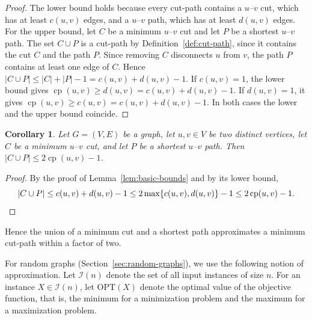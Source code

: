 \documentclass[a4paper,fleqn]{cas-sc}
\numberwithin{equation}{section}
\theoremstyle{definition}
\theoremstyle{plain}
\newtheorem{corollary}[definition]{Corollary}
\theoremstyle{remark}
\newcommand{\cp}{\operatorname{cp}}                  %
\newcommand{\OPT}{\mathrm{OPT}}
\begin{document}
\begin{proof}
The lower bound holds because every cut-path contains a $u$--$v$ cut, which has at least $c(u, v)$ edges, and a $u$--$v$ path, which has at least $d(u, v)$ edges.
For the upper bound, let $C$ be a minimum $u$--$v$ cut and let $P$ be a shortest $u$--$v$ path.
The set $C \cup P$ is a cut-path by Definition~\ref{def:cut-path}, since it contains the cut $C$ and the path $P$.
Since removing $C$ disconnects $u$ from $v$, the path $P$ contains at least one edge of $C$.
Hence $|C \cup P| \leq |C| + |P| - 1 = c(u, v) + d(u, v) - 1$.
If $c(u, v) = 1$, the lower bound gives $\cp(u, v) \geq d(u, v) = c(u, v) + d(u, v) - 1$.
If $d(u, v) = 1$, it gives $\cp(u, v) \geq c(u, v) = c(u, v) + d(u, v) - 1$.
In both cases the lower and the upper bound coincide.
\end{proof}

\begin{corollary}
\label{cor:two-approximation}
Let $G = (V, E)$ be a graph, let $u, v \in V$ be two distinct vertices, let $C$ be a minimum $u$--$v$ cut, and let $P$ be a shortest $u$--$v$ path.
Then $|C \cup P| \leq 2\cp(u, v) - 1$.
\end{corollary}

\begin{proof}
By the proof of Lemma~\ref{lem:basic-bounds} and by its lower bound,
\[
|C \cup P| \leq c(u, v) + d(u, v) - 1 \leq 2\max\{c(u, v), d(u, v)\} - 1 \leq 2\cp(u, v) - 1. \qedhere
\]
\end{proof}

Hence the union of a minimum cut and a shortest path approximates a minimum cut-path within a factor of two.

For random graphs (Section~\ref{sec:random-graphs}), we use the following notion of approximation.
Let $\mathcal{I}(n)$ denote the set of all input instances of size $n$.
For an instance $X \in \mathcal{I}(n)$, let $\OPT(X)$ denote the optimal value of the objective function, that is, the minimum for a minimization problem and the maximum for a maximization problem.
\end{document}
